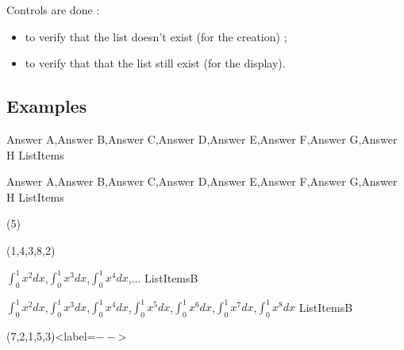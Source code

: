 \documentclass[english,11pt,a4paper]{article}
\begin{document}
\medskip

Controls are done :

\begin{itemize}
	\item to verify that the list doesn't exist (for the creation) ;
	\item to verify that that the list still exist (for the display).
\end{itemize}

\subsection{Examples}

\begin{codehigh}[language=latex/latex3,style/main=teal!25,style/code=teal!25]
\CreateItemsList%
    {Answer A,Answer B,Answer C,Answer D,Answer E,Answer F,Answer G,Answer H}%
    {\mylistofitems}{ListItems}
\end{codehigh}

\CreateItemsList%
{Answer A,Answer B,Answer C,Answer D,Answer E,Answer F,Answer G,Answer H}%
{\mylistofitems}{ListItems}

\begin{demohigh}[language=latex/latex3,style/main=teal!25,style/code=teal!25]
(5)
\end{demohigh}

\begin{demohigh}[language=latex/latex3,style/main=teal!25,style/code=teal!25]
(1,4,3,8,2)
\end{demohigh}

\begin{codehigh}[language=latex/latex3,style/main=teal!25,style/code=teal!25]
\CreateItemsList%
    {{$\int_0^1 x^2 dx$},{$\int_0^1 x^3 dx$},{$\int_0^1 x^4 dx$},...}%
    {\mylistofitemsb}{ListItemsB}
\end{codehigh}

\CreateItemsList%
{{$\int_0^1 x^2 dx$},{$\int_0^1 x^3 dx$},{$\int_0^1 x^4 dx$},{$\int_0^1 x^5 dx$},{$\int_0^1 x^6 dx$},{$\int_0^1 x^7 dx$},{$\int_0^1 x^8 dx$}}%
{\mylistofitemsb}{ListItemsB}

\begin{codehigh}[language=latex/latex3,style/main=teal!25,style/code=teal!25]
(7,2,1,5,3)<label=$--$>
\end{codehigh}
\end{document}
